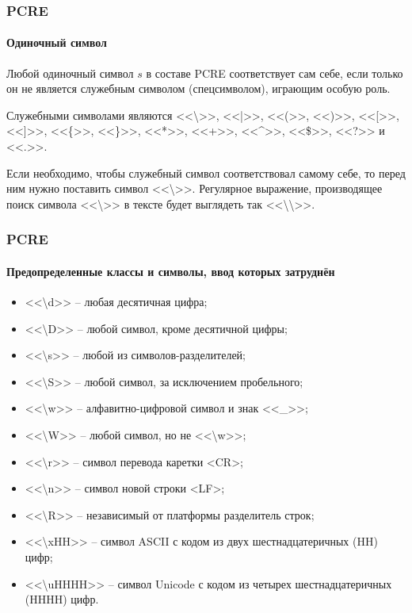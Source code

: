 \begin{frame}
    \frametitle{PCRE}
    \framesubtitle{Одиночный символ}
    
    Любой одиночный символ $s$ в составе PCRE соответствует сам себе, если только он не является служебным символом (спецсимволом), играющим особую роль. 
    
    Служебными символами являются <<\textbackslash>>, <<|>>, <<(>>, <<)>>, <<[>>, <<]>>, <<\{>>, <<\}>>, <<*>>, <<+>>, <<\^{}>>, <<\$>>, <<?>> и <<.>>. 
    
    Если необходимо, чтобы служебный символ соответствовал самому себе, то перед ним нужно поставить символ <<\textbackslash>>. Регулярное выражение, производящее поиск символа <<\textbackslash>> в тексте будет выглядеть так <<\textbackslash\textbackslash>>.
\end{frame}

\begin{frame}
    \frametitle{PCRE}
    \framesubtitle{Предопределенные классы и символы, ввод которых затруднён}
    
    \begin{itemize}
        \item{} <<\textbackslash d>> – любая десятичная цифра;
        \item{} <<\textbackslash D>> – любой символ, кроме десятичной цифры;
        \item{} <<\textbackslash s>> – любой из символов-разделителей;
        \item{} <<\textbackslash S>> – любой символ, за исключением пробельного;
        \item{} <<\textbackslash w>> – алфавитно-цифровой символ и знак <<\_>>;
        \item{} <<\textbackslash W>> – любой символ, но не <<\textbackslash w>>;
        \item{} <<\textbackslash r>>  – символ перевода каретки <CR>;
        \item{} <<\textbackslash n>>  – символ новой строки <LF>;
        \item{} <<\textbackslash R>>  – независимый от платформы разделитель строк;
        \item{} <<\textbackslash xHH>> – символ ASCII с кодом из двух шестнадцатеричных (HH) цифр;
        \item{} <<\textbackslash uHHHH>> – символ Unicode с кодом из четырех шестнадцатеричных (HHHH) цифр.
    \end{itemize}
\end{frame}

